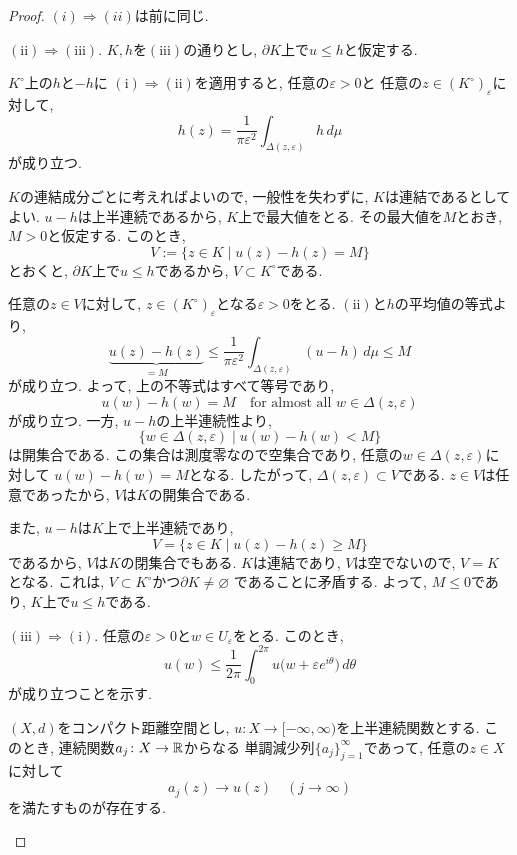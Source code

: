 \begin{proof}
$(i) \Rightarrow (ii)$は前に同じ.

$\mathrm{(ii)} \Rightarrow \mathrm{(iii)}$.
$K,h$を$\mathrm{(iii)}$の通りとし,
$\partial K$上で$u \leq h$と仮定する.

$K^\circ$上の$h$と$-h$に
$\mathrm{(i)} \Rightarrow \mathrm{(ii)}$を適用すると,
任意の$\varepsilon > 0$と
任意の$z \in (K^\circ)_\varepsilon$に対して,
\[
h(z)
=
\frac{1}{\pi\varepsilon^2}
\int_{\Delta(z,\varepsilon)} h\,d\mu
\]
が成り立つ.

$K$の連結成分ごとに考えればよいので,
一般性を失わずに, $K$は連結であるとしてよい.
$u-h$は上半連続であるから,
$K$上で最大値をとる.
その最大値を$M$とおき, $M>0$と仮定する.
このとき,
\[
V:=\{z \in K \mid u(z)-h(z)=M\}
\]
とおくと, $\partial K$上で$u \leq h$であるから,
$V \subset K^\circ$である.

任意の$z \in V$に対して,
$z \in (K^\circ)_\varepsilon$となる$\varepsilon>0$をとる.
$\mathrm{(ii)}$と$h$の平均値の等式より,
\[
\underbrace{u(z)-h(z)}_{=M}
\leq
\frac{1}{\pi\varepsilon^2}
\int_{\Delta(z,\varepsilon)} (u-h)\,d\mu
\leq M
\]
が成り立つ.
よって, 上の不等式はすべて等号であり,
\[
u(w)-h(w)=M
\quad
\text{for almost all $w \in \Delta(z,\varepsilon)$}
\]
が成り立つ.
一方, $u-h$の上半連続性より,
\[
\{w \in \Delta(z,\varepsilon) \mid u(w)-h(w)<M\}
\]
は開集合である.
この集合は測度零なので空集合であり,
任意の$w \in \Delta(z,\varepsilon)$に対して
$u(w)-h(w)=M$となる.
したがって, $\Delta(z,\varepsilon) \subset V$である.
$z \in V$は任意であったから, $V$は$K$の開集合である.

また, $u-h$は$K$上で上半連続であり,
\[
V=\{z \in K \mid u(z)-h(z)\geq M\}
\]
であるから, $V$は$K$の閉集合でもある.
$K$は連結であり, $V$は空でないので, $V=K$となる.
これは, $V \subset K^\circ$かつ$\partial K \neq \varnothing$
であることに矛盾する.
よって, $M \leq 0$であり, $K$上で$u \leq h$である.

$\mathrm{(iii)} \Rightarrow \mathrm{(i)}$.
任意の$\varepsilon > 0$と$w \in U_\varepsilon$をとる.
このとき,
\[
u(w)
\leq
\frac{1}{2\pi}
\int_0^{2\pi}
u\bigl(w+\varepsilon e^{i\theta}\bigr)\,d\theta
\]
が成り立つことを示す.

\begin{tcolorbox}[mybox]
\begin{claim}
$(X,d)$をコンパクト距離空間とし,
$u \colon X \to [-\infty,\infty)$を上半連続関数とする.
このとき, 連続関数$a_j \colon X \to \mathbb{R}$からなる
単調減少列$\{a_j\}_{j=1}^{\infty}$であって,
任意の$z \in X$に対して
\[
a_j(z) \to u(z)
\quad (j \to \infty)
\]
を満たすものが存在する.
\end{claim}
\end{tcolorbox}


\end{proof}
